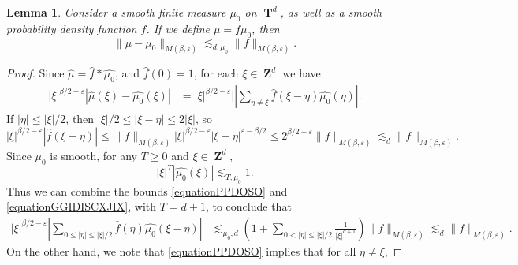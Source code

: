 \documentclass[12pt,reqno]{article}
\numberwithin{equation}{section}
\DeclareMathOperator{\ZZ}{\mathbf{Z}}
\DeclareMathOperator{\TT}{\mathbf{T}}
\newtheorem{lemma}{Lemma}
\begin{document}
\begin{lemma} \label{LemmaTTSICICS}
    Consider a smooth finite measure $\mu_0$ on $\TT^d$, as well as a smooth probability density function $f$. If we define $\mu = f \mu_0$, then
    \[ \| \mu - \mu_0 \|_{M(\beta,\varepsilon)} \lesssim_{d,\mu_0} \| f \|_{M(\beta,\varepsilon)}. \]
\end{lemma}
\begin{proof}
    Since $\widehat{\mu} = \widehat{f} * \widehat{\mu_0}$, and $\widehat{f}(0) = 1$, for each $\xi \in \ZZ^d$ we have
    \begin{equation} \label{equationPPYTUECUUCS}
    \begin{split}
        |\xi|^{\beta/2 - \varepsilon} |\widehat{\mu}(\xi) - \widehat{\mu_0}(\xi)| &= |\xi|^{\beta/2 - \varepsilon}| \left| \sum_{\eta \neq \xi} \widehat{f}(\xi - \eta) \widehat{\mu_0}(\eta) \right|.
    \end{split}
    \end{equation}
    If $|\eta| \leq |\xi|/2$, then $|\xi|/2 \leq |\xi - \eta| \leq 2 |\xi|$, so
    \begin{equation} \label{equationPPDOSO}
        |\xi|^{\beta/2 - \varepsilon} |\widehat{f}(\xi - \eta)| \leq \| f \|_{M(\beta,\varepsilon)} |\xi|^{\beta/2 - \varepsilon} |\xi-\eta|^{\varepsilon-\beta/2} \leq 2^{\beta/2 - \varepsilon} \| f \|_{M(\beta,\varepsilon)} \lesssim_d \| f \|_{M(\beta,\varepsilon)}.
    \end{equation}
    Since $\mu_0$ is smooth, for any $T \geq 0$ and $\xi \in \ZZ^d$,
    \begin{equation} \label{equationGGIDISCXJIX}
        |\xi|^T |\widehat{\mu_0}(\xi)| \lesssim_{T,\mu_0} 1.
    \end{equation}
    Thus we can combine the bounds \eqref{equationPPDOSO} and \eqref{equationGGIDISCXJIX}, with $T = d+1$, to conclude that
    \begin{equation} \label{equationGGPSOVVCSI}
    \begin{split}
        |\xi|^{\beta/2 - \varepsilon} \left| \sum_{0 \leq |\eta| \leq |\xi|/2} \widehat{f}(\eta) \widehat{\mu_0}(\xi - \eta) \right| &\lesssim_{\mu_0,d} \left( 1 + \sum_{0 < |\eta| \leq |\xi|/2} \frac{1}{|\xi|^{d+1}} \right) \| f \|_{M(\beta,\varepsilon)} \lesssim_d \| f \|_{M(\beta,\varepsilon)}.
    \end{split}
    \end{equation}
    On the other hand, we note that \eqref{equationPPDOSO} implies that for all $\eta \neq \xi$,

\end{proof}
\end{document}
